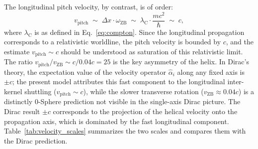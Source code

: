 \documentclass[%
 reprint, amsmath,amssymb, aps, prb, ]{revtex4-2}
\numberwithin{equation}{section}
\newcommand{\omZB}{\omega_{\text{ZB}}}
\newcommand{\lambdaC}{\lambda_{\mathrm{C}}}
\begin{document}
The longitudinal pitch velocity, by contrast, is of order:
\begin{equation}
v_{\text{pitch}} \;\sim\; \Delta x \cdot \omZB \;\sim\; \lambdaC \cdot \frac{mc^2}{\hbar} \;\sim\; c,
\label{eq:pitch_velocity}
\end{equation}
where $\lambdaC$ is as defined in Eq.~\eqref{eq:compton}. Since the longitudinal propagation corresponds to a relativistic worldline, the pitch velocity is bounded by $c$, and the estimate $v_{\text{pitch}} \sim c$ should be understood as saturation of this relativistic limit. The ratio $v_{\text{pitch}}/v_{\mathrm{ZB}} \sim c/0.04c = 25$ is the key asymmetry of the helix. In Dirac's theory, the expectation value of the velocity operator $\hat{\alpha}_i$ along any fixed axis is $\pm c$; the present model attributes this fast component to the longitudinal inter-kernel shuttling ($v_{\text{pitch}}\sim c$), while the slower transverse rotation ($v_{\mathrm{ZB}}\approx 0.04c$) is a distinctly 0-Sphere prediction not visible in the single-axis Dirac picture. The Dirac result $\pm c$ corresponds to the projection of the helical velocity onto the propagation axis, which is dominated by the fast longitudinal component. Table~\ref{tab:velocity_scales} summarizes the two scales and compares them with the Dirac prediction.
\end{document}
